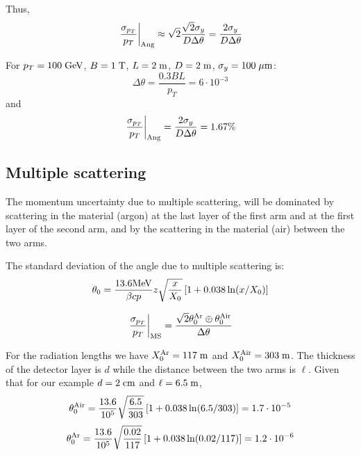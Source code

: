 \documentclass[a4paper,11pt,twoside]{article}
\begin{document}
Thus,
\begin{equation}
  \left.\frac{\sigma_{p_T}}{p_T}\right|_{\rm Ang}\approx \sqrt{2}\frac{\sqrt{2}\sigma_y}{D\Delta\theta}
  = \frac{2\sigma_y}{D\Delta\theta}
\end{equation}

For $p_T=100\;{\rm GeV}$, $B=1\;{\rm T}$, $L=2\;{\rm m}$, $D=2\;{\rm m}$, $\sigma_y=100\;{\rm \mu m}$:
\begin{equation}
  \Delta\theta = \frac{0.3BL}{p_T}=6\cdot 10^{-3}
\end{equation}
and
\begin{equation}
  \left.\frac{\sigma_{p_T}}{p_T}\right|_{\rm Ang}= \frac{2\sigma_y}{D\Delta\theta}=1.67\%
\end{equation}

\subsection{Multiple scattering}
The momentum uncertainty due to multiple scattering, will be dominated
by scattering in the material (argon) at the last layer of the first
arm and at the first layer of the second arm, and by the scattering in
the material (air) between the two arms.

The standard deviation of the angle due to multiple scattering is:
\begin{equation}
  \theta_0 = \frac{13.6{\rm MeV}}{\beta c p}z\sqrt{\frac{x}{X_0}}\left[1+0.038\ln(x/X_0)\right]
\end{equation}

\begin{equation}
  \left.\frac{\sigma_{p_T}}{p_T}\right|_{\rm MS}= \frac{\sqrt{2}\theta^{\rm Ar}_0\oplus \theta^{\rm Air}_0}{\Delta\theta}
\end{equation}



For the radiation lengths we have $X_0^{\rm Ar}=117\;{\rm m}$ and $X_0^{\rm Air}=303\;{\rm m}$.
The thickness of the detector layer is $d$ while the distance between the two arms is $\ell$.
Given that for our example $d=2\;{\rm cm}$ and $\ell=6.5\;{\rm m}$,
\begin{equation}
\theta^{\rm Air}_{0} = \frac{13.6}{10^5}\sqrt{\frac{6.5}{303}}\left[1+0.038\ln(6.5/303)\right]=  1.7\cdot 10^{-5}
\end{equation}
\begin{equation}
\theta^{\rm Ar}_{0} = \frac{13.6}{10^5}\sqrt{\frac{0.02}{117}}\left[1+0.038\ln(0.02/117)\right]=  1.2\cdot 10^{-6}
\end{equation}
\end{document}
